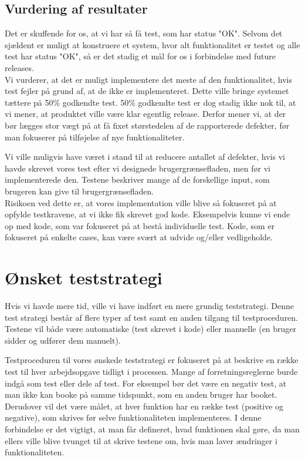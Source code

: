 \subsection{Vurdering af resultater}
\label{Test_Results_eval}
Det er skuffende for os, at vi har så få test, som har status "OK". Selvom det sjældent er muligt at konstruere et system, hvor alt funktionalitet er testet og alle test har status "OK", så er det stadig et mål for os i forbindelse med future releases. 
\\Vi vurderer, at det er muligt implementere det meste af den funktionalitet, hvis test fejler på grund af, at de ikke er implementeret. Dette ville bringe systemet tættere på 50\% godkendte test. 50\% godkendte test er dog stadig ikke nok til, at vi mener, at produktet ville være klar egentlig release. Derfor mener vi, at der bør lægges stor vægt på at få fixet størstedelen af de rapporterede defekter, før man fokuserer på tilføjelse af nye funktionaliteter.

Vi ville muligvis have været i stand til at reducere antallet af defekter, hvis vi havde skrevet vores test efter vi designede brugergrænsefladen, men før vi implementerede den. Testene beskriver mange af de forskellige input, som brugeren kan give til brugergrænsefladen. 
\\Risikoen ved dette er, at vores implementation ville blive så fokuseret på at opfylde testkravene, at vi ikke fik skrevet god kode. Eksempelvis kunne vi ende op med kode, som var fokuseret på at bestå individuelle test. Kode, som er fokuseret på enkelte cases, kan være svært at udvide og/eller vedligeholde.

\section{Ønsket teststrategi}
\label{Test_intendedStrat}
Hvis vi havde mere tid, ville vi have indført en mere grundig teststrategi. Denne test strategi består af flere typer af test samt en anden tilgang til testproceduren. Testene vil både være automatiske (test skrevet i kode) eller manuelle (en bruger sidder og udfører dem manuelt).

Testproceduren til vores ønskede teststrategi er fokuseret på at beskrive en række test til hver arbejdsopgave tidligt i processen. Mange af forretningsreglerne burde indgå som test eller dele af test. For eksempel bør det være en negativ test, at man ikke kan booke på samme tidspunkt, som en anden bruger har booket.
\\Derudover vil det være målet, at hver funktion har en række test (positive og negative), som skrives før selve funktionaliteten implementeres. I denne forbindelse er det vigtigt, at man får defineret, hvad funktionen skal gøre, da man ellers ville blive tvunget til at skrive testene om, hvis man laver ændringer i funktionaliteten.

